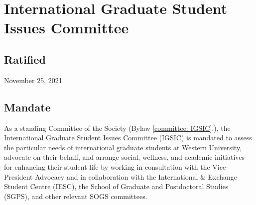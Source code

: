 \section{International Graduate Student Issues Committee}

\subsection{Ratified}
November 25, 2021

\subsection{Mandate}
As a standing Committee of the Society (Bylaw \ref{committee: IGSIC}.), the International Graduate Student Issues Committee (IGSIC) is mandated to assess the particular needs of international graduate students at Western University, advocate on their behalf, and arrange social, wellness, and academic initiatives for enhancing their student life by working in consultation with the Vice-President Advocacy and in collaboration with the International \& Exchange Student Centre (IESC), the School of Graduate and Postdoctoral Studies (SGPS), and other relevant SOGS committees.

